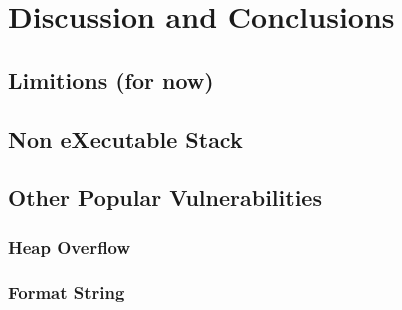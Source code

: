 \chapter{Discussion and Conclusions}

\section{Limitions (for now)}
\section{Non eXecutable Stack}

\section{Other Popular Vulnerabilities}
\subsection{Heap Overflow}
\subsection{Format String}
